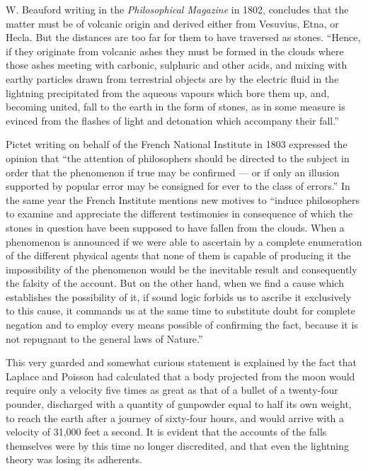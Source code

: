 \documentclass[a4paper, 11pt, oneside]{article}
\begin{document}
W. Beauford writing in the \emph{Philosophical Magazine} in 1802, concludes that the matter must be of volcanic origin and derived either from Vesuvius, Etna, or Hecla. But the distances are too far for them to have traversed as stones. ``Hence, if they originate from volcanic ashes they must be formed in the clouds where those ashes meeting with carbonic, sulphuric and other acids, and mixing with earthy particles drawn from terrestrial objects are by the electric fluid in the lightning precipitated from the aqueous vapours which bore them up, and, becoming united, fall to the earth in the form of stones, as in some measure is evinced from the flashes of light and detonation which accompany their fall.'' 

Pictet writing on behalf of the French National Institute in 1803 expressed the opinion that ``the attention of philosophers should be directed to the subject in order that the phenomenon if true may be confirmed --- or if only an illusion supported by popular error may be consigned for ever to the class of errors.'' In the same year the French Institute mentions new motives to ``induce philosophers to examine and appreciate the different testimonies in consequence of which the stones in question have been supposed to have fallen from the clouds. When a phenomenon is announced if we were able to ascertain by a complete enumeration of the different physical agents that none of them is capable of producing it the impossibility of the phenomenon would be the inevitable result and consequently the falsity of the account. But on the other hand, when we find a cause which establishes the possibility of it, if sound logic forbids us to ascribe it exclusively to this cause, it commands us at the same time to substitute doubt for complete negation and to employ every means possible of confirming the fact, because it is not repugnant to the general laws of Nature.'' 

This very guarded and somewhat curious statement is explained by the fact that Laplace and Poisson had calculated that a body projected from the moon would require only a velocity five times as great as that of a bullet of a twenty-four pounder, discharged with a quantity of gunpowder equal to half its own weight, to reach the earth after a journey of sixty-four hours, and would arrive with a velocity of 31,000 feet a second. It is evident that the accounts of the falls themselves were by this time no longer discredited, and that even the lightning theory was losing its adherents. 
\end{document}
